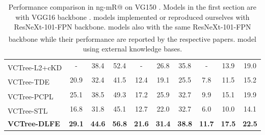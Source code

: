 \documentclass[sigconf]{acmart}
\begin{document}
\begin{table*}[htbp]
{\begin{tabular}{l|c c c|c c c|c c c}
VCTree-L2+cKD\textsuperscript{} \cite{DBLP:conf/bmvc/WangPL20} & - & 38.4 & 52.4 & - & 26.8 & 35.8 & - & 13.9 & 19.0 \\
VCTree-TDE\textsuperscript{} \cite{tang2020unbiased} & 20.9 & 32.4 & 41.5 & 12.4 & 19.1 & 25.5 & 7.8 & 11.5 & 15.2 \\
VCTree-PCPL\textsuperscript{} \cite{yan2020pcpl} & 25.1 & 38.5 & 49.3 & 17.2 & 25.9 & 32.7 & 9.9 & 15.1 & 19.9 \\
VCTree-STL\textsuperscript{} \cite{chen2019soft} & 16.8 & 31.8 & 45.1 & 12.7 & 22.0 & 32.7 & 6.0 & 10.0 & 14.1 \\
\textbf{VCTree-DLFE} & \textbf{29.1} & \textbf{44.6} & \textbf{56.8} & \textbf{21.6} & \textbf{31.4} & \textbf{38.8} & \textbf{11.7} & \textbf{17.5} & \textbf{22.5} \\
\hline
\end{tabular}
}
\vspace{0.3em}
\caption{Performance comparison in ng-mR@ on VG150 \cite{krishna2017visual,xu2017scene}.
Models in the first section are with VGG16 backbone \cite{simonyan2014very}.
 models implemented or reproduced ourselves with ResNeXt-101-FPN \cite{lin2017feature} backbone.
 models also with the same ResNeXt-101-FPN backbone while their performance are reported by the respective papers.
\textsuperscript{} model using external knowledge bases.
}
\vspace{-1.5em}
\label{tab:sgg_ng_mr_result}
\end{table*}
\end{document}
